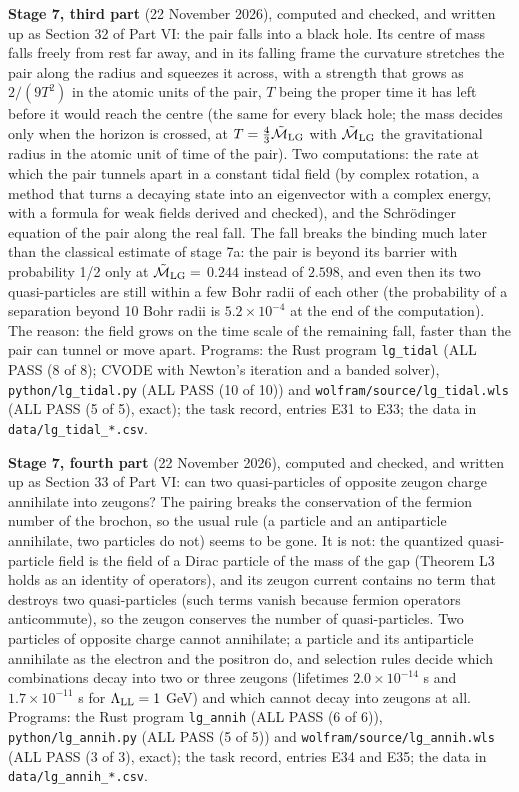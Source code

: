 \documentclass[
  10pt,
]{article}
\begin{document}
\textbf{Stage 7, third part} (22 November 2026), computed and checked,
and written up as Section 32 of Part VI: the pair falls into a black
hole. Its centre of mass falls freely from rest far away, and in its
falling frame the curvature stretches the pair along the radius and
squeezes it across, with a strength that grows as \(2/(9T^2)\) in the
atomic units of the pair, \(T\) being the proper time it has left before
it would reach the centre (the same for every black hole; the mass
decides only when the horizon is crossed, at
\(T=\tfrac43\tilde{\mathcal M}_{\rm LG}\) with
\(\tilde{\mathcal M}_{\rm LG}\) the gravitational radius in the atomic
unit of time of the pair). Two computations: the rate at which the pair
tunnels apart in a constant tidal field (by complex rotation, a method
that turns a decaying state into an eigenvector with a complex energy,
with a formula for weak fields derived and checked), and the Schrödinger
equation of the pair along the real fall. The fall breaks the binding
much later than the classical estimate of stage 7a: the pair is beyond
its barrier with probability 1/2 only at
\(\tilde{\mathcal M}_{\rm LG}=\) \(0.244\) instead of \(2.598\), and
even then its two quasi-particles are still within a few Bohr radii of
each other (the probability of a separation beyond 10 Bohr radii is
\(5.2\times10^{-4}\) at the end of the computation). The reason: the
field grows on the time scale of the remaining fall, faster than the
pair can tunnel or move apart. Programs: the Rust program
\texttt{lg\_tidal} (ALL PASS (8 of 8); CVODE with Newton's iteration and
a banded solver), \texttt{python/lg\_tidal.py} (ALL PASS (10 of 10)) and
\texttt{wolfram/source/lg\_tidal.wls} (ALL PASS (5 of 5), exact); the
task record, entries E31 to E33; the data in
\texttt{data/lg\_tidal\_*.csv}.

\textbf{Stage 7, fourth part} (22 November 2026), computed and checked,
and written up as Section 33 of Part VI: can two quasi-particles of
opposite zeugon charge annihilate into zeugons? The pairing breaks the
conservation of the fermion number of the brochon, so the usual rule (a
particle and an antiparticle annihilate, two particles do not) seems to
be gone. It is not: the quantized quasi-particle field is the field of a
Dirac particle of the mass of the gap (Theorem L3 holds as an identity
of operators), and its zeugon current contains no term that destroys two
quasi-particles (such terms vanish because fermion operators
anticommute), so the zeugon conserves the number of quasi-particles. Two
particles of opposite charge cannot annihilate; a particle and its
antiparticle annihilate as the electron and the positron do, and
selection rules decide which combinations decay into two or three
zeugons (lifetimes \(2.0\times10^{-14}\) s and \(1.7\times10^{-11}\) s
for \(\Lambda_{\rm LL}=1\) GeV) and which cannot decay into zeugons at
all. Programs: the Rust program \texttt{lg\_annih} (ALL PASS (6 of 6)),
\texttt{python/lg\_annih.py} (ALL PASS (5 of 5)) and
\texttt{wolfram/source/lg\_annih.wls} (ALL PASS (3 of 3), exact); the
task record, entries E34 and E35; the data in
\texttt{data/lg\_annih\_*.csv}.
\end{document}
